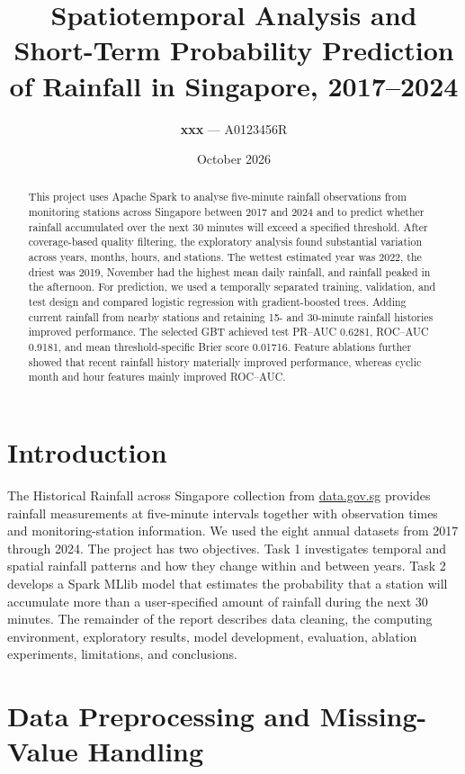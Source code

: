 \documentclass[11pt]{article}
\title{Spatiotemporal Analysis and Short-Term Probability Prediction\\
of Rainfall in Singapore, 2017--2024}
\author{
\textbf{xxx} --- A0123456R}
\date{October 2026}
\begin{document}
\maketitle

\begin{abstract}
This project uses Apache Spark to analyse five-minute rainfall observations
from monitoring stations across Singapore between 2017 and 2024 and to predict
whether rainfall accumulated over the next 30 minutes will exceed a specified
threshold. After coverage-based quality filtering, the exploratory analysis
found substantial variation across years, months, hours, and stations. The
wettest estimated year was 2022, the driest was 2019, November had the highest
mean daily rainfall, and rainfall peaked in the afternoon. For prediction, we
used a temporally separated training, validation, and test design and compared
logistic regression with gradient-boosted trees. Adding current rainfall from
nearby stations and retaining 15- and 30-minute rainfall histories improved
performance. The selected GBT achieved test PR--AUC 0.6281, ROC--AUC 0.9181,
and mean threshold-specific Brier score 0.01716. Feature ablations further
showed that recent rainfall history materially improved performance, whereas
cyclic month and hour features mainly improved ROC--AUC.
\end{abstract}

\section{Introduction}

The Historical Rainfall across Singapore collection from
\href{https://data.gov.sg/collections/2279/view}{data.gov.sg} provides rainfall
measurements at five-minute intervals together with observation times and
monitoring-station information. We used the eight annual datasets from 2017
through 2024. The project has two objectives. Task 1 investigates temporal and
spatial rainfall patterns and how they change within and between years. Task 2
develops a Spark MLlib model that estimates the probability that a station
will accumulate more than a user-specified amount of rainfall during the next
30 minutes. The remainder of the report describes data cleaning, the computing
environment, exploratory results, model development, evaluation, ablation
experiments, limitations, and conclusions.

\section{Data Preprocessing and Missing-Value Handling}
\end{document}
